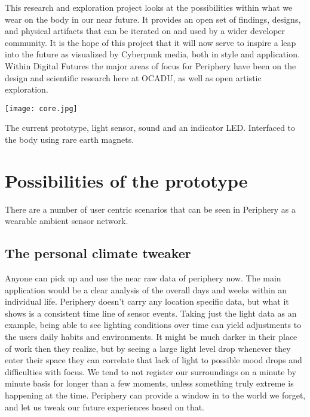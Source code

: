 
This research and exploration project looks at the possibilities within what we wear on the body in our near future. It provides an open set of findings, designs, and physical artifacts that can be iterated on and used by a wider developer community. It is the hope of this project that it will now serve to inspire a leap into the future as visualized by Cyberpunk media, both in style and application. Within Digital Futures the major areas of focus for Periphery have been on the design and scientific research here at OCADU, as well as open artistic exploration.  

\begin{marginfigure}
  \texttt{[image: core.jpg]}
  \caption{The current prototype, light sensor, sound and an indicator LED. Interfaced to the body using rare earth magnets.}
  \label{fig:currentprototype}
\end{marginfigure}

\section{Possibilities of the prototype}
There are a number of user centric scenarios that can be seen in Periphery as a wearable ambient sensor network.

\subsection{The personal climate tweaker}\label{subsec:personalclimate}
Anyone can pick up and use the near raw data of periphery now. The main application would be a clear analysis of the overall days and weeks within an individual life. Periphery doesn't carry any location specific data, but what it shows is a consistent time line of sensor events. Taking just the light data as an example, being able to see lighting conditions over time can yield adjustments to the users daily habits and environments. It might be much darker in their place of work then they realize, but by seeing a large light level drop whenever they enter their space they can correlate that lack of light to possible mood drops and difficulties with focus. We tend to not register our surroundings on a minute by minute basis for longer than a few moments, unless something truly extreme is happening at the time. Periphery can provide a window in to the world we forget, and let us tweak our future experiences based on that.

